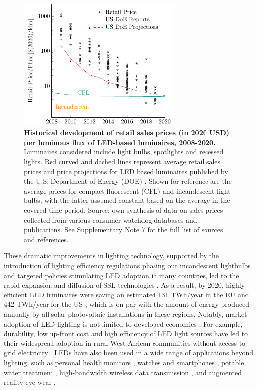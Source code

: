 \documentclass[parskip=full]{article}
\begin{document}
\begin{figure}[h!]
\centering
  \includegraphics[height=6.5cm]{figures/cost_lamp_small.pdf}
  \caption{\textbf{Historical development of retail sales prices (in 2020 USD) per luminous flux of LED-based luminaires, 2008-2020.} Luminaires considered include light bulbs, spotlights and recessed lights. Red curved and dashed lines represent average retail sales prices and price projections for LED based luminaires published by the U.S. Department of Energy (DOE) \cite{council2013assessment}. Shown for reference are the average prices for compact fluorescent (CFL) and incandescent light bulbs, with the latter assumed constant based on the average in the covered time period. Source: own synthesis of data on sales prices collected from various consumer watchdog databases and publications. See Supplementary Note 7 for the full list of sources and references.}
  \label{fgr:cost_lamp_small}
\end{figure}

These dramatic improvements in lighting technology, supported by the introduction of lighting efficiency regulations phasing out incandescent lightbulbs and targeted policies stimulating LED adoption in many countries, led to the rapid expansion and diffusion of SSL technologies \cite{weinold2020long,stegmaier2021incandescent}. As a result, by 2020, highly efficient LED luminaires were saving an estimated 131 TWh/year in the EU \cite{eu2019impactass} and 442 TWh/year for the US \cite{guidehouse2020adoption}, which is on par with the amount of energy produced annually by all solar photovoltaic installations in these regions. Notably, market adoption of LED lighting is not limited to developed economies \cite{Kamat2020}. For example, durability, low up-front cost and high efficiency of LED light sources have led to their widespread adoption in rural West African communities without access to grid electricity \cite{Bensch2017}. LEDs have also been used in a wide range of applications beyond lighting, such as personal health monitors \cite{Wyatt2020}, watches and smartphones \cite{Bai2017}, potable water treatment \cite{Lui2014}, high-bandwidth wireless data transmission \cite{Haas2016}, and augmented reality eye wear \cite{Lee2016}. 
\end{document}
